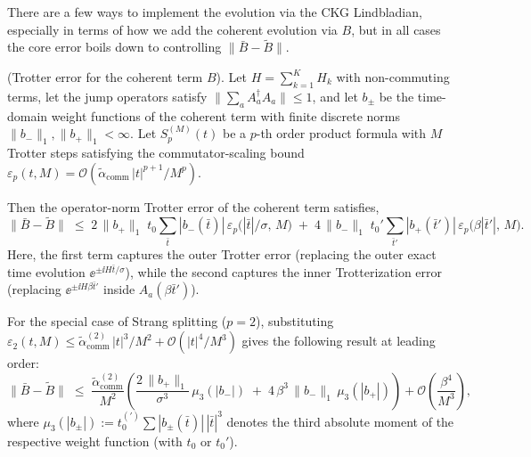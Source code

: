 There are a few ways to implement the evolution via the CKG Lindbladian, especially in terms of how we add the coherent evolution via $B$, but in all cases the core error boils down to controlling $\|\bar{B} - \tilde{B}\|$.
\begin{proposition} \label{prop:trotter-B}
    \textup{(Trotter error for the coherent term $B$).} Let $H = \sum_{k=1}^K H_k$ with non-commuting terms, let the jump operators satisfy $\bigl\|\sum_a A_a^\dagger A_a\bigr\| \leq 1$, and let $b_\pm$ be the time-domain weight functions of the coherent term with finite discrete norms $\|b_-\|_{1}, \|b_+\|_{1} < \infty$. Let $S_p^{(M)}(t)$ be a $p$-th order product formula with $M$ Trotter steps satisfying the commutator-scaling bound $\varepsilon_p(t, M) = \mathcal{O}(\tilde{\alpha}_{\mathrm{comm}}\,|t|^{p+1}/M^p)$.

    Then the operator-norm Trotter error of the coherent term satisfies, 
    $$
    \|\bar{B} - \tilde{B}\|
    \;\leq\;
    2\,\|b_+\|_{1}\; t_0 \sum_{\bar{t}} |b_-(\bar{t})|\, \varepsilon_p\!\bigl(|\bar{t}|/\sigma,\, M\bigr)
    \;+\;
    4\,\|b_-\|_{1}\; t_0' \sum_{\bar{t}'} |b_+(\bar{t}')|\, \varepsilon_p\!\bigl(\beta|\bar{t}'|,\, M\bigr).
    $$
    Here, the first term captures the outer Trotter error (replacing the outer exact time evolution $\ee^{\pm \ii H \bar{t} / \sigma}$), while the second captures the inner Trotterization error (replacing $\ee^{\pm \ii H\beta\bar{t}'}$ inside $A_a(\beta \bar{t}')$).

    For the special case of Strang splitting ($p = 2$), substituting $\varepsilon_2(t, M) \leq \tilde{\alpha}_{\mathrm{comm}}^{(2)}\,|t|^3/M^2 + \mathcal{O}(|t|^4/M^3)$ gives the following result at leading order:
    $$
    \|\bar{B} - \tilde{B}\|
    \;\leq\;
    \frac{\tilde{\alpha}_{\mathrm{comm}}^{(2)}}{M^2}
    \left(
    \frac{2\,\|b_+\|_1}{\sigma^3}\, \mu_3(|b_-|)
    \;+\;
    4\,\beta^3\,\|b_-\|_1\, \mu_3(|b_+|)
    \right)
    + \mathcal{O}\!\left(\frac{\beta^4}{M^3}\right),
    $$
    where $\mu_3(|b_\pm|) := t_0^{(\prime)} \sum |b_\pm(\bar{t})|\,|\bar{t}|^3$ denotes the third absolute moment of the respective weight function (with $t_0$ or $t_0'$).
\end{proposition}
